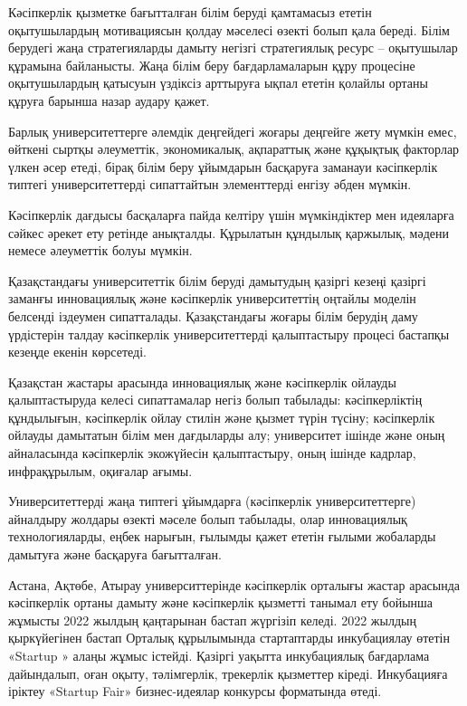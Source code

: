\begin{multicols}{2}

Кәсіпкерлік қызметке бағытталған білім беруді қамтамасыз ететін
оқытушылардың мотивациясын қолдау мәселесі өзекті болып қала береді.
Білім берудегі жаңа стратегияларды дамыту негізгі стратегиялық ресурс --
оқытушылар құрамына байланысты. Жаңа білім беру бағдарламаларын құру
процесіне оқытушылардың қатысуын үздіксіз арттыруға ықпал ететін қолайлы
ортаны құруға барынша назар аудару қажет.

Барлық университеттерге әлемдік деңгейдегі жоғары деңгейге жету мүмкін
емес, өйткені сыртқы әлеуметтік, экономикалық, ақпараттық және құқықтық
факторлар үлкен әсер етеді, бірақ білім беру ұйымдарын басқаруға
заманауи кәсіпкерлік типтегі университеттерді сипаттайтын элементтерді
енгізу әбден мүмкін.

Кәсіпкерлік дағдысы басқаларға пайда келтіру үшін мүмкіндіктер мен
идеяларға сәйкес әрекет ету ретінде анықталды. Құрылатын құндылық
қаржылық, мәдени немесе әлеуметтік болуы мүмкін.

Қазақстандағы университеттік білім беруді дамытудың қазіргі кезеңі
қазіргі заманғы инновациялық және кәсіпкерлік университеттің оңтайлы
моделін белсенді іздеумен сипатталады. Қазақстандағы жоғары білім
берудің даму үрдістерін талдау кәсіпкерлік университеттерді қалыптастыру
процесі бастапқы кезеңде екенін көрсетеді.

Қазақстан жастары арасында инновациялық және кәсіпкерлік ойлауды
қалыптастыруда келесі сипаттамалар негіз болып табылады: кәсіпкерліктің
құндылығын, кәсіпкерлік ойлау стилін және қызмет түрін түсіну;
кәсіпкерлік ойлауды дамытатын білім мен дағдыларды алу; университет
ішінде және оның айналасында кәсіпкерлік экожүйесін қалыптастыру, оның
ішінде кадрлар, инфрақұрылым, оқиғалар ағымы.

Университеттерді жаңа типтегі ұйымдарға (кәсіпкерлік университеттерге)
айналдыру жолдары өзекті мәселе болып табылады, олар инновациялық
технологияларды, еңбек нарығын, ғылымды қажет ететін ғылыми жобаларды
дамытуға және басқаруға бағытталған.

Астана, Ақтөбе, Атырау университтерінде кәсіпкерлік орталығы жастар
арасында кәсіпкерлік ортаны дамыту және кәсіпкерлік қызметті танымал ету
бойынша жұмысты 2022 жылдың қаңтарынан бастап жүргізіп келеді. 2022
жылдың қыркүйегінен бастап Орталық құрылымында стартаптарды инкубациялау
өтетін «Startup » алаңы жұмыс істейді. Қазіргі уақытта инкубациялық
бағдарлама дайындалып, оған оқыту, тәлімгерлік, трекерлік қызметтер
кіреді. Инкубацияға іріктеу «Startup Fair» бизнес-идеялар конкурсы
форматында өтеді.


\end{multicols}
